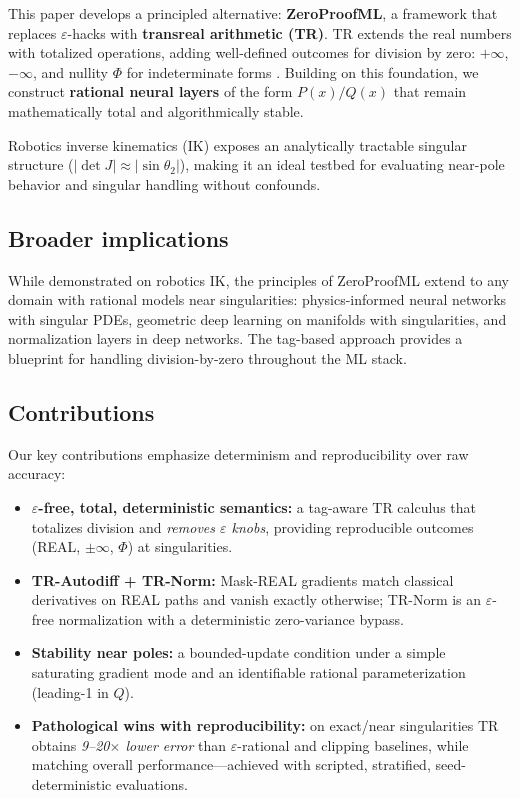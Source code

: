 \documentclass[11pt,twoside]{article}
\begin{document}
This paper develops a principled alternative: \textbf{ZeroProofML}, a framework that replaces $\varepsilon$-hacks with \textbf{transreal arithmetic (TR)}. TR extends the real numbers with totalized operations, adding well-defined outcomes for division by zero: $+\infty$, $-\infty$, and nullity $\Phi$ for indeterminate forms \citep{anderson2019transmathematics,dosreis2016transreal}. Building on this foundation, we construct \textbf{rational neural layers} of the form $P(x)/Q(x)$ that remain mathematically total and algorithmically stable.

Robotics inverse kinematics (IK) exposes an analytically tractable singular structure ($|\det J|\approx|\sin\theta_2|$), making it an ideal testbed for evaluating near-pole behavior and singular handling without confounds.

\subsection{Broader implications}

While demonstrated on robotics IK, the principles of ZeroProofML extend to any domain with rational models near singularities: physics-informed neural networks with singular PDEs, geometric deep learning on manifolds with singularities, and normalization layers in deep networks. The tag-based approach provides a blueprint for handling division-by-zero throughout the ML stack.

\subsection{Contributions}

Our key contributions emphasize determinism and reproducibility over raw accuracy:
\begin{itemize}
  \item \textbf{$\varepsilon$-free, total, deterministic semantics:} a tag-aware TR calculus that totalizes division and \emph{removes $\varepsilon$ knobs}, providing reproducible outcomes (REAL, $\pm\infty$, $\Phi$) at singularities.
  \item \textbf{TR-Autodiff + TR-Norm:} Mask-REAL gradients match classical derivatives on REAL paths and vanish exactly otherwise; TR-Norm is an $\varepsilon$-free normalization with a deterministic zero-variance bypass.
  \item \textbf{Stability near poles:} a bounded-update condition under a simple saturating gradient mode and an identifiable rational parameterization (leading-1 in $Q$).
  \item \textbf{Pathological wins with reproducibility:} on exact/near singularities TR obtains \emph{9--20$\times$ lower error} than $\varepsilon$-rational and clipping baselines, while matching overall performance---achieved with scripted, stratified, seed-deterministic evaluations.
\end{itemize}
\end{document}
